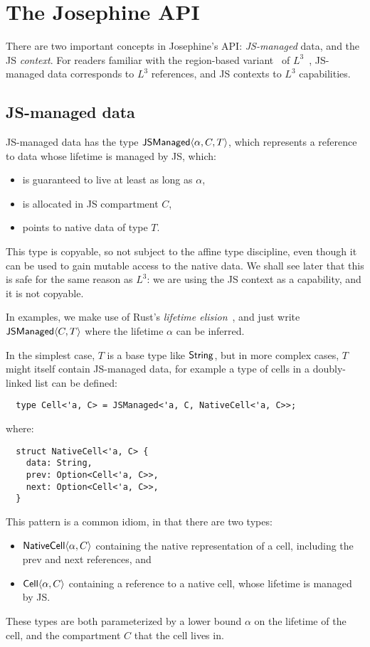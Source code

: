 \section{The Josephine API}

There are two important concepts in Josephine's API: \emph{JS-managed} data,
and the JS \emph{context}. For readers familiar with the region-based
variant~\cite{l3-with-regions} of $L^3$~\cite{l3}, JS-managed data
corresponds to $L^3$ references, and JS contexts to $L^3$ capabilities.

\subsection{JS-managed data}

JS-managed data has the type $\mathsf{JSManaged}\langle \alpha, C, T\rangle$, which represents
a reference to data whose lifetime is managed by JS, which:
\begin{itemize}

\item is guaranteed to live at least as long as $\alpha$,
\item is allocated in JS compartment $C$,
\item points to native data of type $T$.
  
\end{itemize}
This type is copyable, so not subject to the affine type discipline,
even though it can be used to gain mutable access to the native
data. We shall see later that this is safe for the same reason as
$L^3$: we are using the JS context as a capability, and it is not
copyable.

In examples, we make use of Rust's \emph{lifetime elision}~\cite[\S3.4]{rustinomicon},
and just write $\mathsf{JSManaged}\langle C,T\rangle$ where the lifetime $\alpha$ can be
inferred.

In the simplest case, $T$ is a base type like $\mathsf{String}$, but in more complex
cases, $T$ might itself contain JS-managed data, for example a type of
cells in a doubly-linked list can be defined:
\begin{verbatim}
  type Cell<'a, C> = JSManaged<'a, C, NativeCell<'a, C>>;
\end{verbatim}
where:
\begin{verbatim}
  struct NativeCell<'a, C> {
    data: String,
    prev: Option<Cell<'a, C>>,
    next: Option<Cell<'a, C>>,
  }
\end{verbatim}
This pattern is a common idiom, in that there are two types:
\begin{itemize}
\item $\mathsf{NativeCell}\langle \alpha,C\rangle$ containing the native representation
of a cell, including the prev and next
references, and
\item $\mathsf{Cell}\langle \alpha,C\rangle$ containing a reference to a native cell,
whose lifetime is managed by JS.
\end{itemize}
These types are both parameterized by a lower bound $\alpha$ on the lifetime
of the cell, and the compartment $C$ that the cell lives in.

